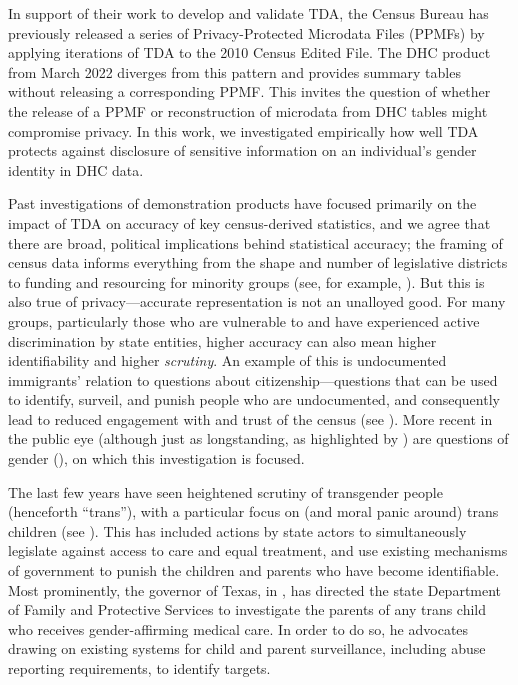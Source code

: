 \documentclass{jpc} %
\theoremstyle{plain}\newtheorem{satz}[thm]{Satz} %
\begin{document}
In support of their work to develop and validate TDA,  the Census Bureau has previously released a series of Privacy-Protected Microdata Files (PPMFs) by applying iterations of TDA to the 2010 Census Edited File.  The DHC product from March 2022 diverges from this pattern and provides summary tables without releasing a corresponding PPMF.  This invites the question of whether the release of a PPMF or reconstruction of microdata from DHC tables might compromise privacy.  In this work, we investigated empirically how well TDA protects against disclosure of sensitive information on an individual's gender identity in DHC data.


Past investigations of demonstration products have focused primarily on the impact of TDA on accuracy of key census-derived statistics,
and we agree that there are broad, political implications behind statistical accuracy; the framing of census data informs everything from the shape and number of legislative districts to funding and resourcing for minority groups (see, for example, \cite{thompson2012making}). But this is also true of privacy---accurate representation is not an unalloyed good. For many groups, particularly those who are vulnerable to and have experienced active discrimination by state entities, higher accuracy can also mean higher identifiability and higher \textit{scrutiny}. An example of this is undocumented immigrants' relation to questions about citizenship---questions that can be used to identify, surveil, and punish people who are undocumented, and consequently lead to reduced engagement with and trust of the census (see \cite{barreto2019}). More recent in the public eye (although just as longstanding, as highlighted by \cite{canaday2009straight}) are questions of gender (\cite{singer2015profusion}), on which this investigation is focused.

The last few years have seen heightened scrutiny of transgender people (henceforth ``trans''), with a particular focus on (and moral panic around) trans children (see \cite{slothouber2020trans}). This has included actions by state actors to simultaneously legislate against access to care and equal treatment, and use existing mechanisms of government to punish the children and parents who have become identifiable. Most prominently, the governor of Texas, in \cite{abbottletter}, has directed the state Department of Family and Protective Services to investigate the parents of any trans child who receives gender-affirming medical care. In order to do so, he advocates drawing on existing systems for child and parent surveillance, including abuse reporting requirements, to identify targets.
\end{document}
